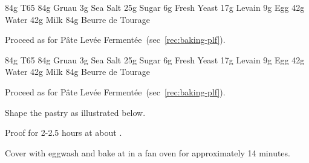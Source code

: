 \label{rec:baking-crossiant}

\begin{ingreds}
	84g T65
	84g Gruau
	3g Sea Salt
	25g Sugar
	6g Fresh Yeast
	17g Levain
	9g Egg
	42g Water
	42g Milk
	84g Beurre de Tourage
\end{ingreds}

\begin{method}[]
Proceed as for P\^ate Lev\'ee Ferment\'ee~(sec~\ref{rec:baking-plf}).

\end {method}

\label{rec:baking-pain-au-chocolat}

\begin{ingreds}
	84g T65
	84g Gruau
	3g Sea Salt
	25g Sugar
	6g Fresh Yeast
	17g Levain
	9g Egg
	42g Water
	42g Milk
	84g Beurre de Tourage
\end{ingreds}

\begin{method}[]
Proceed as for P\^ate Lev\'ee Ferment\'ee~(sec~\ref{rec:baking-plf}).

Shape the pastry as illustrated below.

Proof for 2-2.5 hours at about .

Cover with eggwash and bake at  in a fan oven for approximately 14 minutes.







\end {method}




